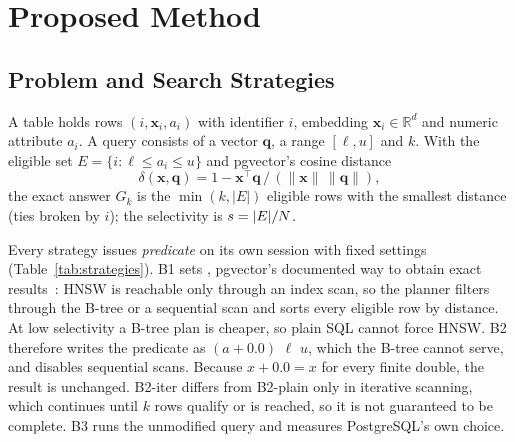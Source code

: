 \section{Proposed Method}
\label{sec:method}

\subsection{Problem and Search Strategies}
A table holds rows $(i,\mathbf{x}_i,a_i)$ with identifier $i$, embedding $\mathbf{x}_i\in\mathbb{R}^{d}$ and numeric
attribute $a_i$. A query consists of a vector $\mathbf{q}$, a range $[\ell,u]$ and $k$. With the eligible set
$E=\{i:\ell\le a_i\le u\}$ and pgvector's cosine distance
\begin{equation}
\delta(\mathbf{x},\mathbf{q})=1-\mathbf{x}^{\top}\mathbf{q}\,/\,(\lVert\mathbf{x}\rVert\,\lVert\mathbf{q}\rVert),
\label{eq:cos}
\end{equation}
the exact answer $G_k$ is the $\min(k,|E|)$ eligible rows with the smallest distance (ties broken by $i$); the
selectivity is $s=|E|/N$.

Every strategy issues  \emph{predicate}  on
its own session with fixed settings (Table~\ref{tab:strategies}). B1 sets , pgvector's
documented way to obtain exact results~\cite{pgvector}: HNSW is reachable only through an index scan, so the planner
filters through the B-tree or a sequential scan and sorts every eligible row by distance. At low selectivity a B-tree
plan is cheaper, so plain SQL cannot force HNSW. B2 therefore writes the predicate as $(a+0.0)$  $\ell$
 $u$, which the B-tree cannot serve, and disables sequential scans. Because $x+0.0=x$ for every finite
double, the result is unchanged. B2-iter differs from B2-plain only in iterative scanning, which continues until $k$
rows qualify or  is reached, so it is not guaranteed to be complete. B3 runs the unmodified
query and measures PostgreSQL's own choice.

